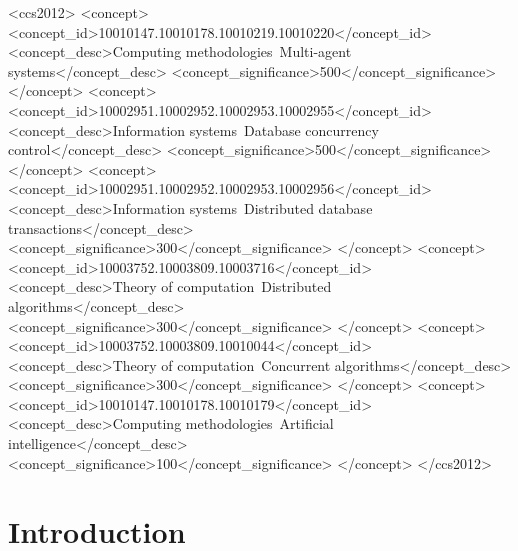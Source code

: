 \documentclass[sigconf]{acmart}
\begin{document}
\begin{CCSXML}
<ccs2012>
   <concept>
       <concept_id>10010147.10010178.10010219.10010220</concept_id>
       <concept_desc>Computing methodologies~Multi-agent systems</concept_desc>
       <concept_significance>500</concept_significance>
   </concept>
   <concept>
       <concept_id>10002951.10002952.10002953.10002955</concept_id>
       <concept_desc>Information systems~Database concurrency control</concept_desc>
       <concept_significance>500</concept_significance>
   </concept>
   <concept>
       <concept_id>10002951.10002952.10002953.10002956</concept_id>
       <concept_desc>Information systems~Distributed database transactions</concept_desc>
       <concept_significance>300</concept_significance>
   </concept>
   <concept>
       <concept_id>10003752.10003809.10003716</concept_id>
       <concept_desc>Theory of computation~Distributed algorithms</concept_desc>
       <concept_significance>300</concept_significance>
   </concept>
   <concept>
       <concept_id>10003752.10003809.10010044</concept_id>
       <concept_desc>Theory of computation~Concurrent algorithms</concept_desc>
       <concept_significance>300</concept_significance>
   </concept>
   <concept>
       <concept_id>10010147.10010178.10010179</concept_id>
       <concept_desc>Computing methodologies~Artificial intelligence</concept_desc>
       <concept_significance>100</concept_significance>
   </concept>
</ccs2012>
\end{CCSXML}



\maketitle

\section{Introduction}
\label{sec:intro}
\end{document}
